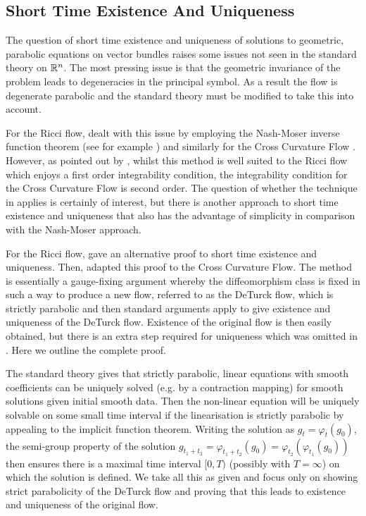 \documentclass[a4paper, 12pt]{amsart}
\begin{document}
\subsection{Short Time Existence And Uniqueness}
\label{subsec:xcf_existence_uniqueness}

The question of short time existence and uniqueness of solutions to geometric, parabolic equations on vector bundles raises some issues not seen in the standard theory on \(\mathbb{R}^n\). The most pressing issue is that the geometric invariance of the problem leads to degeneracies in the principal symbol. As a result the flow is degenerate parabolic and the standard theory must be modified to take this into account.

For the Ricci flow, \cite{Hamilton:/1982} dealt with this issue by employing the Nash-Moser inverse function theorem (see for example \cite{MR656198}) and similarly for the Cross Curvature Flow \cite{MR2055396}. However, as pointed out by \cite{MR2207496}, whilst this method is well suited to the Ricci flow which enjoys a first order integrability condition, the integrability condition for the Cross Curvature Flow is second order. The question of whether the technique in \cite{Hamilton:/1982} applies is certainly of interest, but there is another approach to short time existence and uniqueness that also has the advantage of simplicity in comparison with the Nash-Moser approach.

For the Ricci flow, \cite{MR697987} gave an alternative proof to short time existence and uniqueness. Then, \cite{MR2207496} adapted this proof to the Cross Curvature Flow. The method is essentially a gauge-fixing argument whereby the diffeomorphism class is fixed in such a way to produce a new flow, referred to as the DeTurck flow, which is strictly parabolic and then standard arguments apply to give existence and uniqueness of the DeTurck flow. Existence of the original flow is then easily obtained, but there is an extra step required for uniqueness which was omitted in \cite{MR2207496}. Here we outline the complete proof.

The standard theory gives that strictly parabolic, linear equations with smooth coefficients can be uniquely solved (e.g. by a contraction mapping) for smooth solutions given initial smooth data. Then the non-linear equation will be uniquely solvable on some small time interval if the linearisation is strictly parabolic by appealing to the implicit function theorem. Writing the solution as \(g_t = \varphi_t(g_0)\), the semi-group property of the solution \(g_{t_1 + t_2} = \varphi_{t_1 + t_2} (g_0) = \varphi_{t_2} (\varphi_{t_1} (g_0))\) then ensures there is a maximal time interval \([0, T)\) (possibly with \(T = \infty\)) on which the solution is defined. We take all this as given and focus only on showing strict parabolicity of the DeTurck flow and proving that this leads to existence and uniqueness of the original flow.
\end{document}
